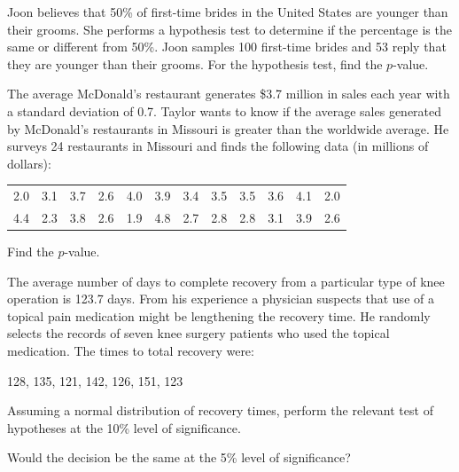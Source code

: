 \begin{exercise}

Joon believes that 50\% of first-time brides in the United States are
younger than their grooms. She performs a hypothesis test to determine
if the percentage is the same or different from 50\%. Joon samples 100
first-time brides and 53 reply that they are younger than their grooms.
For the hypothesis test, find the \(p\)-value.

\end{exercise}
\vspace*{8\baselineskip}

\begin{exercise}

The average McDonald's restaurant generates \$3.7 million in sales each
year with a standard deviation of 0.7. Taylor wants to know if the
average sales generated by McDonald's restaurants in Missouri is greater
than the worldwide average. He surveys 24 restaurants in Missouri and
finds the following data (in millions of dollars):

\begin{tabular}{*{12}{c}}
  2.0 & 3.1 & 3.7 & 2.6 & 4.0 & 3.9 & 3.4 & 3.5 & 3.5 & 3.6 & 4.1 & 2.0 \\ 
  4.4 & 2.3 & 3.8 & 2.6 & 1.9 & 4.8 & 2.7 & 2.8 & 2.8 & 3.1 & 3.9 & 2.6  
\end{tabular}

Find the \(p\)-value.

\end{exercise}
\vspace*{8\baselineskip}

\begin{exercise}

The average number of days to complete recovery from a particular type
of knee operation is 123.7 days. From his experience a physician
suspects that use of a topical pain medication might be lengthening the
recovery time. He randomly selects the records of seven knee surgery
patients who used the topical medication. The times to total recovery
were:

128, 135, 121, 142, 126, 151, 123

Assuming a normal distribution of recovery times, perform the relevant
test of hypotheses at the 10\% level of significance.

Would the decision be the same at the 5\% level of significance?

\end{exercise}
\vspace*{8\baselineskip}
  
